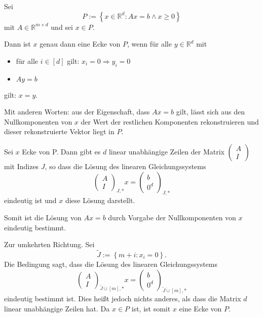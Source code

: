 \documentclass[10p,a4paper,BCOR = 12mm, DIV=15]{scrbook}
\begin{document}
\begin{Le}
\label{sa:ecken_verwendet}
Sei
\begin{displaymath}
P := \left\{x \in \mathbb{R}^d: 
A x = b \wedge x \geq 0
\right\}
\end{displaymath}
mit $A \in \mathbb{R}^{m \times d}$ und sei $x\in P$.

Dann ist $x$ genau dann eine Ecke von $P$, wenn für alle $y \in \mathbb{R}^d$ mit
\begin{itemize}
\item für alle $i \in \left[d\right]$ gilt: $x_i = 0 \Rightarrow y_i = 0$
\item $A y = b$
\end{itemize}
gilt: $x=y$.

Mit anderen Worten: aus der Eigenschaft, dass $A x = b$ gilt, lässt sich aus den Nullkomponenten von $x$ der Wert der restlichen Komponenten rekonstruieren und dieser rekonstruierte Vektor liegt in $P$.
\end{Le}
\begin{bew}
Sei $x$ Ecke von P. Dann gibt es $d$ linear unabhängige Zeilen der Matrix $\left(\begin{array}{c}
A \\
I
\end{array}
\right)$ mit Indizes $J$, so dass die Lösung des linearen Gleichungssystems
\begin{displaymath}
\left(
\begin{array}{c}
A \\
I
\end{array}
\right)_{J, *} x = \left(
\begin{array}{c}
b \\
0^d
\end{array}
\right)_{J, *}
\end{displaymath}
eindeutig ist und $x$ diese Lösung darstellt.

Somit ist die Lösung von $A x = b$ durch Vorgabe der Nullkomponenten von $x$ eindeutig bestimmt.

Zur umkehrten Richtung. Sei
\begin{displaymath}
\widetilde{J} := \left\{m+i: x_i = 0\right\}.
\end{displaymath}
Die Bedingung sagt, dass die Lösung des linearen Gleichungssystems
\begin{displaymath}
\left(
\begin{array}{c}
A \\
I
\end{array}
\right)_{\widetilde{J} \mathbin{\dot{\cup}} \left[m\right], *} x = \left(
\begin{array}{c}
b \\
0^d
\end{array}
\right)_{\widetilde{J} \mathbin{\dot{\cup}} \left[m\right], *}
\end{displaymath}
eindeutig bestimmt ist. Dies heißt jedoch nichts anderes, als dass die Matrix $d$ linear unabhängige Zeilen hat. Da $x \in P$ ist, ist somit $x$ eine Ecke von $P$.
\end{bew}
\end{document}

